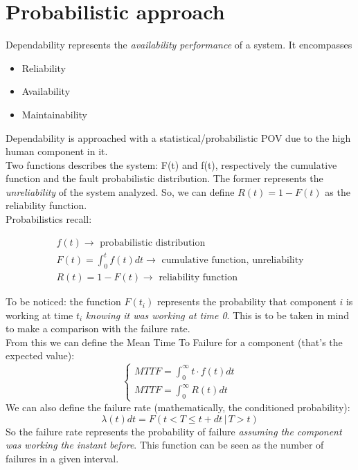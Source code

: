 \documentclass[10pt,a4paper]{article}
\begin{document}
		\section{Probabilistic approach}
			Dependability represents the \emph{availability performance} of a system. It encompasses 
			\begin{itemize}
				\item Reliability
				\item Availability
				\item Maintainability
			\end{itemize}
			
			Dependability is approached with a statistical/probabilistic POV due to the high human component in it.\\
			Two functions describes the system: F(t) and f(t), respectively the cumulative function and the fault probabilistic distribution. The former represents the \emph{unreliability} of the system analyzed. So, we can define $R(t) =  1 - F(t)$ as the reliability function.\\
			Probabilistics recall:

			\begin{align}
				f(t) \rightarrow \text{ probabilistic distribution}\\
				F(t) = \int_{0}^{t}f(t)dt \rightarrow \text{ cumulative function, unreliability}\\
				R(t) = 1 - F(t) \rightarrow \text{ reliability function}
			\end{align}

			To be noticed: the function $F(t_i)$ represents the probability that component $i$ is working at time $t_i$ \emph{knowing it was working at time 0}. This is to be taken in mind to make a comparison with the failure rate.\\
			From this we can define the Mean Time To Failure for a component (that's the expected value):
			\begin{equation}
				\begin{cases}
					MTTF = \int_0^{\infty}t \cdot f(t)dt\\
					MTTF = \int_0^{\infty}R(t)dt
				\end{cases}
			\end{equation}
			We can also define the failure rate (mathematically, the conditioned probability):
			\begin{equation}
				\lambda(t)dt = F(t < T \leq t+dt \,\vert\, T > t)
			\end{equation}
			So the failure rate represents the probability of failure \emph{assuming the component was working the instant before}. This function can be seen as the number of failures in a given interval.
			
\end{document}
